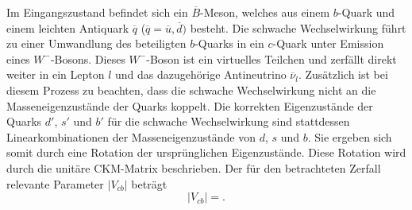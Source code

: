 Im Eingangszustand befindet sich ein $\overline B$-Meson, welches aus einem $b$-Quark und einem leichten Antiquark $\overline q$ ($ \overline q = \overline u, \overline d)$ besteht.
Die schwache Wechselwirkung führt zu einer Umwandlung des beteiligten $b$-Quarks in ein $c$-Quark unter Emission eines $W^{-}$-Bosons. Dieses $W^{-}$-Boson ist ein virtuelles Teilchen und zerfällt direkt weiter in ein Lepton $l$ und das dazugehörige Antineutrino $\overline \nu_l$.
Zusätzlich ist bei diesem Prozess zu beachten, dass die schwache Wechselwirkung nicht an die Masseneigenzustände der Quarks koppelt.
Die korrekten Eigenzustände der Quarks $d'$, $s'$ und $b'$ für die schwache Wechselwirkung sind stattdessen Linearkombinationen der Masseneigenzustände von $d$, $s$ und $b$. Sie ergeben sich somit durch eine Rotation der ursprünglichen Eigenzustände.
Diese Rotation wird durch die unitäre CKM-Matrix beschrieben.
Der für den betrachteten Zerfall relevante Parameter $\lvert V_{cb} \rvert$ beträgt \cite{Bigi2017441}
\begin{equation}
  \lvert V_{cb} \rvert = .
\end{equation}

